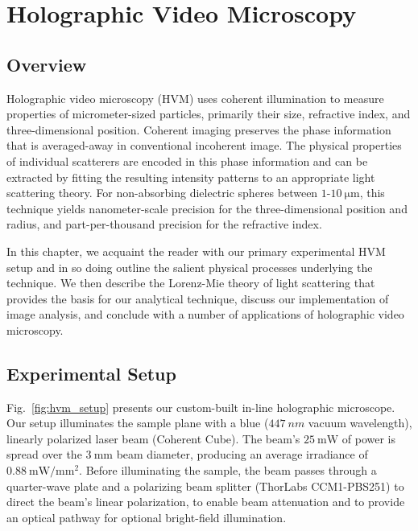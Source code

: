 \chapter{Holographic Video Microscopy}
\label{ch:hvm}

\newcommand{\einc}{\vec{E}_{\text{inc}}}
\newcommand{\escat}{\vec{E}_{\text{s}}}
\newcommand{\eadd}{\vec{E}_{\text{add}}}

\section{Overview}

Holographic video microscopy (HVM) uses coherent
illumination to measure properties of micrometer-sized particles,
primarily their size, refractive index, and three-dimensional position.
Coherent imaging preserves the phase information that is averaged-away
in conventional incoherent image. The physical properties of individual
scatterers are encoded in this phase information and can be extracted by fitting
the resulting intensity patterns to an appropriate light scattering theory.
For non-absorbing dielectric spheres between $\num{1}$-$\SI{10}{\um}$,
this technique yields nanometer-scale precision for the three-dimensional
position and radius, and part-per-thousand precision for the refractive
index\cite{krishnatreya14}.

In this chapter, we acquaint the reader with our primary experimental
HVM setup and in so doing outline the salient physical processes underlying
the technique. We then describe the Lorenz-Mie theory of light
scattering that provides the basis for our analytical technique,
discuss our implementation of image analysis, and 
conclude with a number of applications of holographic video
microscopy.

\section{Experimental Setup}
\label{ch:hvm:sec:hvm}

Fig.~\ref{fig:hvm_setup} presents our custom-built in-line holographic
microscope. Our setup illuminates the sample plane with a blue
($\SI{447}{nm}$ vacuum wavelength), linearly polarized laser beam
(Coherent Cube). The beam's $\SI{25}{\mW}$ of power is spread over
the $\SI{3}{\mm}$ beam diameter, producing an average irradiance
of $\SI{0.88}{\mW / \mm^2}$. Before illuminating the sample, the beam
passes through a quarter-wave plate and a polarizing beam splitter
(ThorLabs CCM1-PBS251) to direct the beam's linear polarization, to
enable beam attenuation and to provide an optical pathway for
optional bright-field illumination.


